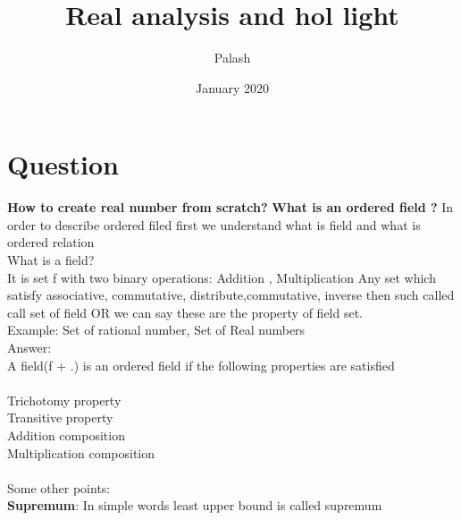 \documentclass{article}
\title{Real analysis and hol light}
\author{Palash }
\date{January 2020}
\begin{document}
\maketitle

\section{Question}
\textbf{How to create real number from scratch?
} \newline
\textbf{What is an ordered field ?}\newline
In order to describe ordered filed first we understand what is field and what is ordered relation\\
{
What is a field?
}\\
It is set f with two binary operations: Addition , Multiplication 
Any set which satisfy associative, commutative, distribute,commutative, inverse then such called call set of field OR we can say these are the property of field set. \\
Example: Set of rational number, Set of Real numbers\\
Answer: \\
A field(f + .) is an ordered field if the following properties are satisfied \\
\vspace{2mm}
\\
Trichotomy property\\
Transitive property\\
Addition composition\\
Multiplication composition\\
\\
Some other points:\\

\textbf{Supremum}: In simple words least upper bound is called supremum \\
\end{document}
